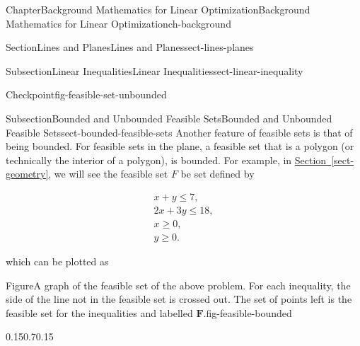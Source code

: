 \documentclass[oneside,10pt,]{book}
\newcommand{\xreffont}{\relax}
\numberwithin{equation}{section}
\begin{document}
\begin{chapterptx}{Chapter}{Background Mathematics for Linear Optimization}{}{Background Mathematics for Linear Optimization}{}{}{ch-background}
\begin{sectionptx}{Section}{Lines and Planes}{}{Lines and Planes}{}{}{sect-lines-planes}
\begin{subsectionptx}{Subsection}{Linear Inequalities}{}{Linear Inequalities}{}{}{sect-linear-inequality}
\begin{inlineexercise}{Checkpoint}{}{fig-feasible-set-unbounded}
\end{inlineexercise}%
\end{subsectionptx}
%
%
\typeout{************************************************}
\typeout{************************************************}
%
\begin{subsectionptx}{Subsection}{Bounded and Unbounded Feasible Sets}{}{Bounded and Unbounded Feasible Sets}{}{}{sect-bounded-feasible-sets}
Another feature of feasible sets is that of being bounded. For feasible sets in the plane, a feasible set that is a polygon (or technically the interior of a polygon), is bounded. For example, in \hyperref[sect-geometry]{Section~{\xreffont\ref{sect-geometry}}}, we will see the feasible set \(F\) be set defined by%
\par
%
\begin{equation*}
\begin{aligned} x+ y \leq 7, \\ 2x + 3y \leq 18, \\ x \geq 0, \\ y \geq 0.
\end{aligned}
\end{equation*}
%
\par
which can be plotted as%
\begin{figureptx}{Figure}{A graph of the feasible set of the above problem. For each inequality, the side of the line not in the feasible set is crossed out.  The set of points left is the feasible set for the inequalities and labelled \(\boldsymbol{F}\).}{fig-feasible-bounded}{}%
\begin{image}{0.15}{0.7}{0.15}{}%
\end{image}
\end{figureptx}
\end{subsectionptx}
\end{sectionptx}
\end{chapterptx}
\end{document}
